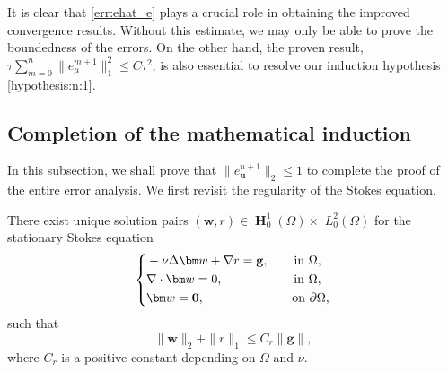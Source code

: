 \begin{remark} It is clear that \eqref{err:ehat_e} 	plays a crucial role in obtaining the improved convergence results. Without this estimate, we may only be able to prove the boundedness of the errors. On the other hand, the proven result, $\tau \sum_{m=0}^{n} \|e_\mu^{m+1}\|_1^2 \le C \tau^2$, is also essential to resolve our induction hypothesis \eqref{hypothesis:n:1}.
\end{remark}
\subsection{Completion of the mathematical induction} \label{subec:induct}
In this subsection, we shall prove that $\|e_{\bm u}^{n+1}\|_2 \le 1$ to complete the proof of the entire error analysis.
We first revisit the regularity of the Stokes equation.
\begin{lemma}  \label{lem:stokes}
	There exist unique solution pairs $(\bm w, r) \in \mbfH_0^1(\Omega) \times$ $L_0^2(\Omega)$ for the stationary Stokes equation 
	\begin{equation*} 
		\left\{
		\begin{aligned}
			& -\nu \Delta \bm w+\nabla r=\mathbf{g}, \quad\quad {\rm in }~ \Omega, \\
			& \nabla \cdot \bm w=0, \qquad \qquad \quad ~~ {\rm in }~ \Omega, \\
			& \bm w=\mathbf{0},  \qquad \qquad \qquad \quad  {\rm on }~ \partial \Omega,
		\end{aligned}
		\right.
	\end{equation*}
	such that  
	\begin{equation*}
		\|\bm w\|_2+\|r\|_1 \leq C_r\|\mathbf{g}\|,
	\end{equation*}
	where  $C_r$ is a positive constant depending on $\Omega$ and $\nu$. 
\end{lemma}


